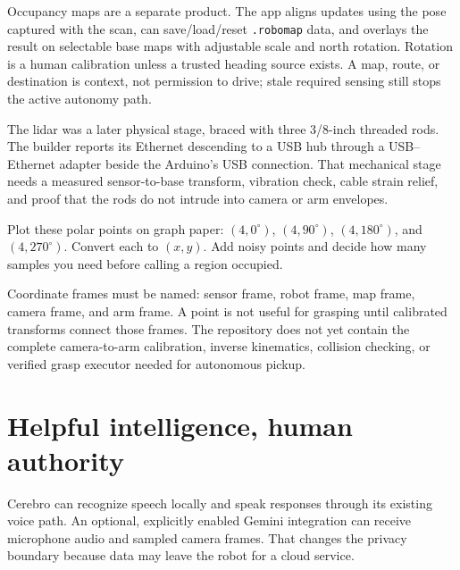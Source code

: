 \documentclass[11pt,openany]{book}
\begin{document}
Occupancy maps are a separate product. The app aligns updates using the pose captured with the scan, can save/load/reset \texttt{.robomap} data, and overlays the result on selectable base maps with adjustable scale and north rotation. Rotation is a human calibration unless a trusted heading source exists. A map, route, or destination is context, not permission to drive; stale required sensing still stops the active autonomy path.

The lidar was a later physical stage, braced with three 3/8-inch threaded rods. The builder reports its Ethernet descending to a USB hub through a USB--Ethernet adapter beside the Arduino's USB connection. That mechanical stage needs a measured sensor-to-base transform, vibration check, cable strain relief, and proof that the rods do not intrude into camera or arm envelopes.

\begin{buildbox}[title={DRAW A TINY LIDAR MAP}]
Plot these polar points on graph paper: $(4,0^\circ)$, $(4,90^\circ)$, $(4,180^\circ)$, and $(4,270^\circ)$. Convert each to $(x,y)$. Add noisy points and decide how many samples you need before calling a region occupied.
\end{buildbox}

\begin{advancedbox}
Coordinate frames must be named: sensor frame, robot frame, map frame, camera frame, and arm frame. A point is not useful for grasping until calibrated transforms connect those frames. The repository does not yet contain the complete camera-to-arm calibration, inverse kinematics, collision checking, or verified grasp executor needed for autonomous pickup.
\end{advancedbox}



\chapter{Helpful intelligence, human authority}

Cerebro can recognize speech locally and speak responses through its existing voice path. An optional, explicitly enabled Gemini integration can receive microphone audio and sampled camera frames. That changes the privacy boundary because data may leave the robot for a cloud service.
\end{document}
